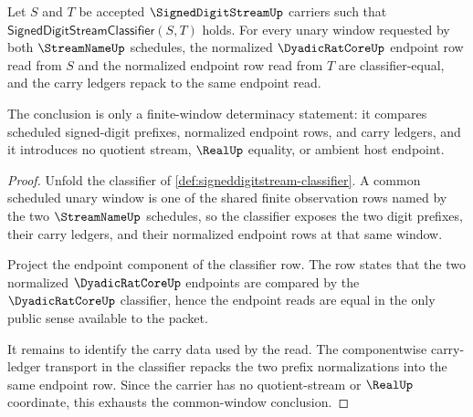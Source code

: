 \begin{theorem}
\label{thm:signeddigitstream-common-window-determinacy}
Let $S$ and $T$ be accepted $\SignedDigitStreamUp$ carriers such that $\mathsf{SignedDigitStreamClassifier}(S,T)$ holds. For every unary window requested by both $\StreamNameUp$ schedules, the normalized $\DyadicRatCoreUp$ endpoint row read from $S$ and the normalized endpoint row read from $T$ are classifier-equal, and the carry ledgers repack to the same endpoint read.

The conclusion is only a finite-window determinacy statement: it compares scheduled signed-digit prefixes, normalized endpoint rows, and carry ledgers, and it introduces no quotient stream, $\RealUp$ equality, or ambient host endpoint.
\end{theorem}
\begin{proof}
Unfold the classifier of \autoref{def:signeddigitstream-classifier}. A common scheduled unary window is one of the shared finite observation rows named by the two $\StreamNameUp$ schedules, so the classifier exposes the two digit prefixes, their carry ledgers, and their normalized endpoint rows at that same window.

Project the endpoint component of the classifier row. The row states that the two normalized $\DyadicRatCoreUp$ endpoints are compared by the $\DyadicRatCoreUp$ classifier, hence the endpoint reads are equal in the only public sense available to the packet.

It remains to identify the carry data used by the read. The componentwise carry-ledger transport in the classifier repacks the two prefix normalizations into the same endpoint row. Since the carrier has no quotient-stream or $\RealUp$ coordinate, this exhausts the common-window conclusion.
\end{proof}

